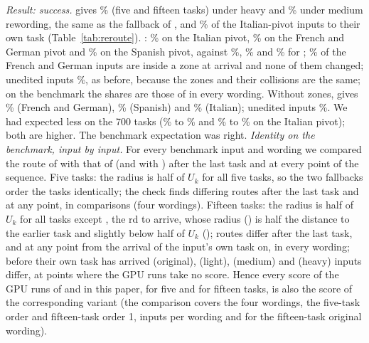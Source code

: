 \emph{Result: success.} \scaled{} gives \RerouteBgHeavyFive{}\% (five and fifteen tasks) under heavy and \RerouteBgMediumFive{}\% under medium rewording, the same as the fallback of \cert{}, and \RerouteBgItOwn{}\% of the Italian-pivot inputs to their own task (Table~\ref{tab:reroute}). \certscaled{}: \RerouteCertFourItOwn{}\% on the Italian pivot, \RerouteCertFourOwnEnd{}\% on the French and German pivot and \RerouteCertFourEsOwn{}\% on the Spanish pivot, against \RerouteCertItOwn{}\%, \RerouteCertOwnEnd{}\% and \RerouteCertEsOwn{}\% for \cert{}; \RerouteCertFourInZone{}\% of the French and German inputs are inside a zone at arrival
and none of them changed; unedited inputs \RerouteCertFourUnOwn{}\%, as before, because the zones and their collisions are the same; on the benchmark the shares are those of \cert{} in every wording. Without zones, \scaled{} gives \RerouteBgOwnEnd{}\% (French and German), \RerouteBgEsOwn{}\% (Spanish) and \RerouteBgItOwn{}\% (Italian); unedited inputs \RerouteBgUnOwn{}\%. We had expected less on the 700 tasks (\RerouteExpectBgItLow{}\% to \RerouteExpectBgItHigh{}\% and \RerouteExpectCfItLow{}\% to \RerouteExpectCfItHigh{}\% on the Italian pivot); both are higher. The benchmark expectation was right.
\emph{Identity on the benchmark, input by input.} For every benchmark input and wording we compared the route of \cert{} with that of \certscaled{} (and \nearest{} with \scaled{}) after the last task and at every point of the sequence. Five tasks: the radius is half of $U_k$ for all five tasks, so the two fallbacks order the tasks identically; the check finds \RerouteIdFiveLast{} differing routes after the last task and \RerouteIdFiveScored{} at any point, in \RerouteIdFiveComparisons{} comparisons (four wordings). Fifteen tasks: the radius is half of $U_k$ for all tasks except \texttt{\RerouteIdTask{}}, the \RerouteIdTaskPos{}rd to arrive, whose radius (\RerouteIdRadius{}) is half the distance to the earlier task \texttt{\RerouteIdEarlier{}} and slightly below half of $U_k$ (\RerouteIdHalfB{}); \RerouteIdFifteenLast{} routes differ after the last task, and \RerouteIdFifteenScored{} at any point from the arrival of the input's own task on, in every wording; before their own task has arrived \RerouteIdFifteenBeforeOriginal{} (original), \RerouteIdFifteenBeforeLight{} (light), \RerouteIdFifteenBeforeMedium{} (medium) and \RerouteIdFifteenBeforeHeavy{} (heavy) inputs differ, at points where the GPU runs take no score. Hence every score of the GPU runs of \cert{} and \nearest{} in this paper, for five and for fifteen tasks, is also the score of the corresponding variant (the comparison covers the four wordings, the five-task order and fifteen-task order 1, \RerouteBenchInputs{} inputs per wording and \RerouteIdFifteenOriginalN{} for the fifteen-task original wording).
